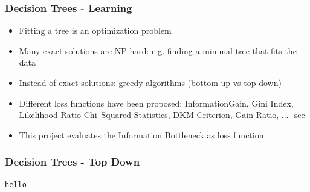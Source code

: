 \begin{frame}
   \frametitle{Decision Trees - Learning}  
   \begin{itemize}
   \item Fitting a tree is an optimization problem
   \item Many exact solutions are NP hard: e.g. finding a minimal tree that fits the data
   \item Instead of exact solutions: greedy algorithms (bottom up vs top down)
   \item Different loss functions have been proposed: \newline
   InformationGain, Gini Index,  Likelihood-Ratio Chi–Squared Statistics, DKM Criterion, Gain Ratio, ...- see \cite{rokach_decision_2005}
   \item This project evaluates the Information Bottleneck as loss function 
   \end{itemize}
\end{frame}


\begin{frame}
   \frametitle{Decision Trees - Top Down}  
\begin{lstlisting}[language=Python, caption=Python example]
hello
\end{lstlisting}
\end{frame}





